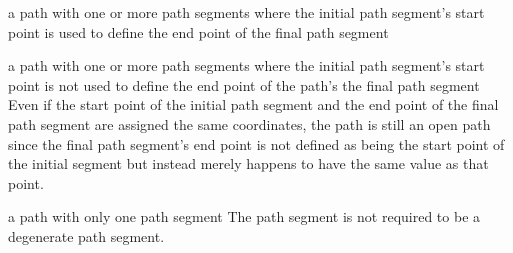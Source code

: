 a path with one or more path segments where the initial path segment's start point is used to define the end point of the final path segment

a path with one or more path segments where the initial path segment's start point is not used to define the end point of the path's the final path segment
\enternote
Even if the start point of the initial path segment and the end point of the final path segment are assigned the same coordinates, the path is still an open path since the final path segment's end point is not defined as being the start point of the initial segment but instead merely happens to have the same value as that point.
\exitnote

a path with only one path segment
\enternote
The path segment is not required to be a degenerate path segment.
\exitnote

